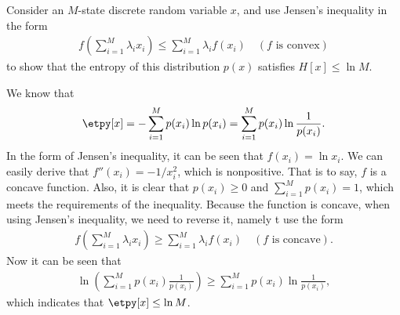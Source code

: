 \begin{question}{1.29}
	Consider an $M$-state discrete random variable $x$, and use Jensen's inequality in the form
	\begin{align*}
		f\left( \sum_{i = 1}^{M} \lambda_i x_i \right) \leq \sum_{i = 1}^{M} \lambda_i f(x_i) \quad (\mbox{$f$ is convex})
	\end{align*}
	to show that the entropy of this distribution $p(x)$ satisfies $H[x] \leq \ln M$.
\end{question}

\begin{answer}{}
	We know that
	\begin{align}
		\etpy[x] = -\sum_{i = 1}^{M} p(x_i) \ln p(x_i) = \sum_{i = 1}^{M} p(x_i) \ln \frac{1}{p(x_i)}.
	\end{align}
	In the form of Jensen's inequality, it can be seen that $f(x_i) = \ln x_i$. We can easily derive that $f''(x_i) = -1 / x_i^2$, which is nonpositive. That is to say, $f$ is a concave function. Also, it is clear that $p(x_i) \geq 0$ and  $\sum_{i = 1}^M p(x_i) = 1$, which meets the requirements of the inequality. Because the function is concave, when using Jensen's inequality, we need to reverse it, namely t use the form
	\begin{align}
		f\left( \sum_{i = 1}^{M} \lambda_i x_i \right) \geq \sum_{i = 1}^{M} \lambda_i f(x_i) \quad (\mbox{$f$ is concave}).
	\end{align}
	Now it can be seen that
	\begin{align}
		\ln\left( \sum_{i = 1}^{M} p(x_i)\frac{1}{p(x_i)}\right) \geq  \sum_{i = 1}^{M} p(x_i) \ln \frac{1}{p(x_i)},
	\end{align}
	which indicates that $\etpy[x] \leq \ln M$.
\end{answer}